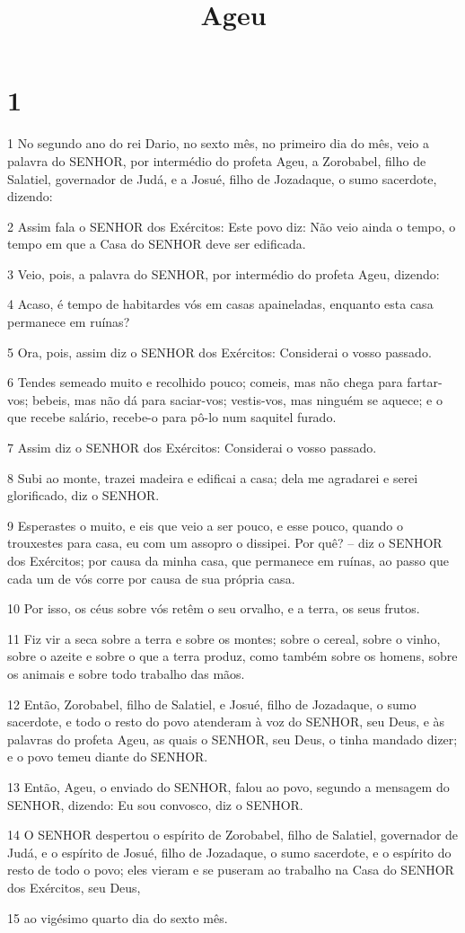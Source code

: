 

\title{Ageu}


\chapter{1}

\par 1 No segundo ano do rei Dario, no sexto mês, no primeiro dia do mês, veio a palavra do SENHOR, por intermédio do profeta Ageu, a Zorobabel, filho de Salatiel, governador de Judá, e a Josué, filho de Jozadaque, o sumo sacerdote, dizendo:
\par 2 Assim fala o SENHOR dos Exércitos: Este povo diz: Não veio ainda o tempo, o tempo em que a Casa do SENHOR deve ser edificada.
\par 3 Veio, pois, a palavra do SENHOR, por intermédio do profeta Ageu, dizendo:
\par 4 Acaso, é tempo de habitardes vós em casas apaineladas, enquanto esta casa permanece em ruínas?
\par 5 Ora, pois, assim diz o SENHOR dos Exércitos: Considerai o vosso passado.
\par 6 Tendes semeado muito e recolhido pouco; comeis, mas não chega para fartar-vos; bebeis, mas não dá para saciar-vos; vestis-vos, mas ninguém se aquece; e o que recebe salário, recebe-o para pô-lo num saquitel furado.
\par 7 Assim diz o SENHOR dos Exércitos: Considerai o vosso passado.
\par 8 Subi ao monte, trazei madeira e edificai a casa; dela me agradarei e serei glorificado, diz o SENHOR.
\par 9 Esperastes o muito, e eis que veio a ser pouco, e esse pouco, quando o trouxestes para casa, eu com um assopro o dissipei. Por quê? -- diz o SENHOR dos Exércitos; por causa da minha casa, que permanece em ruínas, ao passo que cada um de vós corre por causa de sua própria casa.
\par 10 Por isso, os céus sobre vós retêm o seu orvalho, e a terra, os seus frutos.
\par 11 Fiz vir a seca sobre a terra e sobre os montes; sobre o cereal, sobre o vinho, sobre o azeite e sobre o que a terra produz, como também sobre os homens, sobre os animais e sobre todo trabalho das mãos.
\par 12 Então, Zorobabel, filho de Salatiel, e Josué, filho de Jozadaque, o sumo sacerdote, e todo o resto do povo atenderam à voz do SENHOR, seu Deus, e às palavras do profeta Ageu, as quais o SENHOR, seu Deus, o tinha mandado dizer; e o povo temeu diante do SENHOR.
\par 13 Então, Ageu, o enviado do SENHOR, falou ao povo, segundo a mensagem do SENHOR, dizendo: Eu sou convosco, diz o SENHOR.
\par 14 O SENHOR despertou o espírito de Zorobabel, filho de Salatiel, governador de Judá, e o espírito de Josué, filho de Jozadaque, o sumo sacerdote, e o espírito do resto de todo o povo; eles vieram e se puseram ao trabalho na Casa do SENHOR dos Exércitos, seu Deus,
\par 15 ao vigésimo quarto dia do sexto mês.

